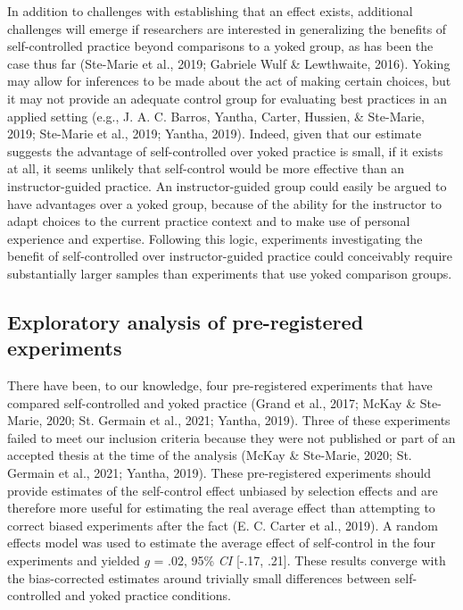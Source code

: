 \documentclass[
  english,
  man,floatsintext]{apa7}
\begin{document}
In addition to challenges with establishing that an effect exists, additional challenges will emerge if researchers are interested in generalizing the benefits of self-controlled practice beyond comparisons to a yoked group, as has been the case thus far (Ste-Marie et al., 2019; Gabriele Wulf \& Lewthwaite, 2016). Yoking may allow for inferences to be made about the act of making certain choices, but it may not provide an adequate control group for evaluating best practices in an applied setting (e.g., J. A. C. Barros, Yantha, Carter, Hussien, \& Ste-Marie, 2019; Ste-Marie et al., 2019; Yantha, 2019). Indeed, given that our estimate suggests the advantage of self-controlled over yoked practice is small, if it exists at all, it seems unlikely that self-control would be more effective than an instructor-guided practice. An instructor-guided group could easily be argued to have advantages over a yoked group, because of the ability for the instructor to adapt choices to the current practice context and to make use of personal experience and expertise. Following this logic, experiments investigating the benefit of self-controlled over instructor-guided practice could conceivably require substantially larger samples than experiments that use yoked comparison groups.

\hypertarget{exploratory-analysis-of-pre-registered-experiments}{%
\subsection{Exploratory analysis of pre-registered experiments}\label{exploratory-analysis-of-pre-registered-experiments}}

There have been, to our knowledge, four pre-registered experiments that have compared self-controlled and yoked practice (Grand et al., 2017; McKay \& Ste-Marie, 2020; St. Germain et al., 2021; Yantha, 2019). Three of these experiments failed to meet our inclusion criteria because they were not published or part of an accepted thesis at the time of the analysis (McKay \& Ste-Marie, 2020; St. Germain et al., 2021; Yantha, 2019). These pre-registered experiments should provide estimates of the self-control effect unbiased by selection effects and are therefore more useful for estimating the real average effect than attempting to correct biased experiments after the fact (E. C. Carter et al., 2019). A random effects model was used to estimate the average effect of self-control in the four experiments and yielded \emph{g} = .02, 95\% \emph{CI} {[}-.17, .21{]}. These results converge with the bias-corrected estimates around trivially small differences between self-controlled and yoked practice conditions.
\end{document}
